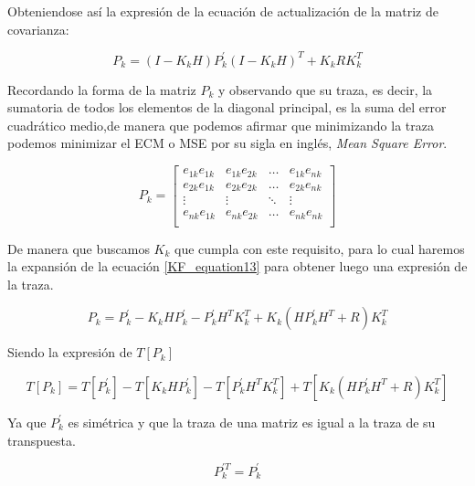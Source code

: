 \documentclass[10pt,a4paper]{article}
\begin{document}
\noindent Obteniendose así la expresión de la ecuación de actualización de 
la matriz de covarianza:

\begin{equation}
    P_k = (I-K_k H)P^\prime_k(I-K_k H)^T + K_k R K_k^T 
    \label{KF_equation13}
\end{equation}	

Recordando la forma de la matriz $P_k$ y observando que su traza, es decir, la
sumatoria de todos los elementos de la diagonal principal, es la suma del error
cuadrático medio,de manera que podemos afirmar que minimizando la traza podemos
minimizar el ECM o MSE por su sigla en inglés, \emph{Mean Square Error}.

\begin{equation}
    P_k = 
    \begin{bmatrix}
	e_{1k}e_{1k} & e_{1k}e_{2k} &	\dots  & e_{1k}e_{nk} \\
	e_{2k}e_{1k} & e_{2k}e_{2k} &	\dots  & e_{2k}e_{nk} \\
	\vdots       &   \vdots     &	\ddots & \vdots       \\
	e_{nk}e_{1k} & e_{nk}e_{2k} &	\dots  & e_{nk}e_{nk} \\
    \end{bmatrix}
\end{equation}

De manera que buscamos $K_k$ que cumpla con este requisito, para lo cual haremos
la expansión de la ecuación \ref{KF_equation13}  para obtener luego una
expresión de la traza.

\begin{equation}
    P_k = P^\prime_k - K_k H P^\prime_k - P^\prime_k H^T K^T_k + K_k (H P^\prime_k H^T + R) K^T_k
    \label{KF_equation14}
\end{equation}	

Siendo la expresión de $T[P_k]$

\begin{equation}
    T[P_k] = T[P^\prime_k] - T[K_k H P^\prime_k] - T[P^\prime_k H^T K^T_k] + T[K_k (H P^\prime_k H^T + R) K^T_k]
    \label{KF_equation15}
\end{equation}	

Ya que $P^\prime_k$ es simétrica  y que la traza de una matriz es igual a la
traza de su transpuesta.

\begin{equation}
    P^{\prime T}_k  = P^\prime_k
    \label{KF_equation16}
\end{equation}	
\end{document}

